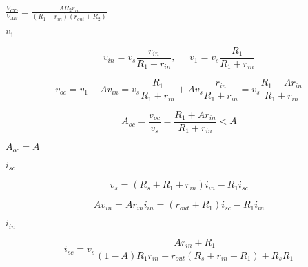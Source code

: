 {\newpage\clearpage
{}%
$\displaystyle \frac{V_{CD}}{V_{AB}}=\frac{A R_2 r_{in}}{(R_1+r_{in})(r_{out}+R_2)}$%
\lthtmlindisplaymathZ
\lthtmlcheckvsize\clearpage}

{\newpage\clearpage
{}%
$v_1$%
\lthtmlinlinemathZ
\lthtmlcheckvsize\clearpage}

{\newpage\clearpage
{}%
\begin{displaymath} v_{in}=v_s \frac{r_{in}}{R_1+r_{in}},\;\;\;\;\;
  v_1=v_s \frac{R_1}{R_1+r_{in}} \end{displaymath}%
\lthtmldisplayZ
\lthtmlcheckvsize\clearpage}

{\newpage\clearpage
{}%
\begin{displaymath} v_{oc}=v_1+A v_{in}=v_s \frac{R_1}{R_1+r_{in}}+Av_s\frac{r_{in}}{R_1+r_{in}}
  =v_s \frac{R_1+A r_{in}}{R_1+r_{in}}  \end{displaymath}%
\lthtmldisplayZ
\lthtmlcheckvsize\clearpage}

{\newpage\clearpage
{}%
\begin{displaymath} A_{oc}=\frac{v_{oc}}{v_s}=\frac{R_1+A r_{in}}{R_1+r_{in}}<A  \end{displaymath}%
\lthtmldisplayZ
\lthtmlcheckvsize\clearpage}

{\newpage\clearpage
{}%
$A_{oc}=A$%
\lthtmlinlinemathZ
\lthtmlcheckvsize\clearpage}

{\newpage\clearpage
{}%
$i_{sc}$%
\lthtmlinlinemathZ
\lthtmlcheckvsize\clearpage}

{\newpage\clearpage
{}%
\begin{displaymath} v_s=(R_s+R_1+r_{in})i_{in}-R_1 i_{sc} \end{displaymath}%
\lthtmldisplayZ
\lthtmlcheckvsize\clearpage}

{\newpage\clearpage
{}%
\begin{displaymath} A v_{in}=A r_{in} i_{in}=(r_{out}+R_1) i_{sc}-R_1 i_{in} \end{displaymath}%
\lthtmldisplayZ
\lthtmlcheckvsize\clearpage}

{\newpage\clearpage
{}%
$i_{in}$%
\lthtmlinlinemathZ
\lthtmlcheckvsize\clearpage}

{\newpage\clearpage
{}%
\begin{displaymath} i_{sc}=v_s \frac{Ar_{in}+R_1}{(1-A)R_1 r_{in} +r_{out}(R_s+r_{in}+R_1)
    +R_sR_1} \end{displaymath}%
\lthtmldisplayZ
\lthtmlcheckvsize\clearpage}

